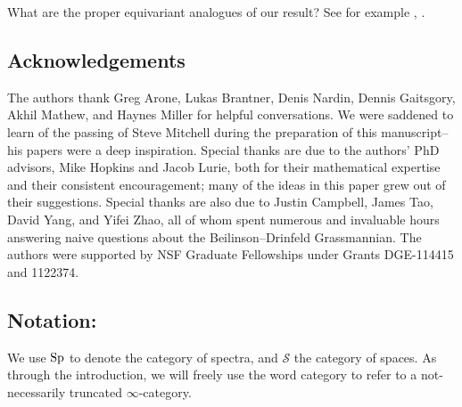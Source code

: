 \begin{qst}
What are the proper equivariant analogues of our result?  See for example \cite{Ullman}, \cite{Tynan}.
\end{qst}

\subsection*{Acknowledgements}
The authors thank Greg Arone, Lukas Brantner, Denis Nardin, Dennis Gaitsgory, Akhil Mathew, and Haynes Miller for helpful conversations.  We were saddened to learn of the passing of Steve Mitchell during the preparation of this manuscript--his papers were a deep inspiration.  Special thanks are due to the authors' PhD advisors, Mike Hopkins and Jacob Lurie, both for their mathematical expertise and their consistent encouragement; many of the ideas in this paper grew out of their suggestions.  Special thanks are also due to Justin Campbell, James Tao, David Yang, and Yifei Zhao, all of whom spent numerous and invaluable hours answering naive questions about the Beilinson--Drinfeld Grassmannian.  The authors were supported by NSF Graduate Fellowships under Grants DGE-114415 and 1122374.

\subsection*{Notation:} We use $\operatorname{\mathrm{Sp}}$ to denote the category of spectra, and $\mathcal{S}$ the category of spaces.  As through the introduction, we will freely use the word category to refer to a not-necessarily truncated $\infty$-category.
